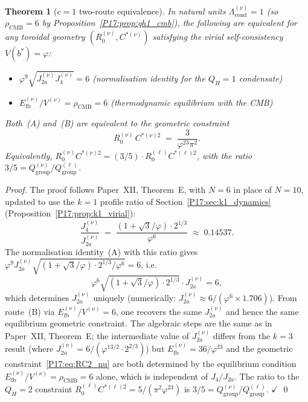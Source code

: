 \documentclass[11pt,a4paper]{article}
\newtheorem{theorem}{Theorem}[section]
\theoremstyle{definition}\newtheorem{definition}[theorem]{Definition}
\theoremstyle{remark}
\newcommand{\vp}{\varphi}
\newcommand{\Ja}{J_{2a}}
\newcommand{\Jfour}{J_4}
\newcommand{\Lcond}{\Lambda_{\mathrm{cond}}}
\newcommand{\rCMB}{\rho_{\mathrm{CMB}}}
\newcommand{\Efb}{E_{\mathrm{fb}}}
\newcommand{\QH}{Q_H}
\begin{document}
\begin{theorem}[$c=1$ two-route equivalence]
\label{P17:thm:qh1_tworoute}
In natural units $\Lcond^{(\nu)}=1$ (so $\rCMB=6$ by
Proposition~\ref{P17:prop:qh1_cmb}), the following are equivalent for
any toroidal geometry $(R_0^{(\nu)},C^{*(\nu)})$ satisfying
the virial self-consistency $V(b^*)=\vp$:
\begin{itemize}[noitemsep]
\item[\textup{(A)}]
  $\vp^9\sqrt{\Ja^{(\nu)}\Jfour^{(\nu)}}=6$
  \quad\textup{(normalisation identity for the $\QH=1$ condensate)}
\item[\textup{(B)}]
  $\Efb^{(\nu)}/V^{(\nu)}=\rCMB=6$
  \quad\textup{(thermodynamic equilibrium with the CMB)}
\end{itemize}
Both~\textup{(A)} and~\textup{(B)} are equivalent to the geometric
constraint
\begin{equation}
  \boxed{R_0^{(\nu)}\,C^{*(\nu)2}
  \;=\; \frac{3}{\vp^{23}\pi^2}.}
  \label{P17:eq:RC2_nu}
\end{equation}
Equivalently, $R_0^{(\nu)}C^{*(\nu)2}=(3/5)\cdot R_0^{(\ell)}C^{*(\ell)2}$,
with the ratio $3/5=Q_{\mathrm{group}}^{(\nu)}/Q_{\mathrm{group}}^{(\ell)}$.
\end{theorem}

\begin{proof}
The proof follows Paper~XII, Theorem~E, with $N=6$ in place of $N=10$,
updated to use the $k=1$ profile ratio of
Section~\ref{P17:sec:k1_dynamics} (Proposition~\ref{P17:prop:k1_virial}):
\begin{equation}
  \frac{\Jfour^{(\nu)}}{\Ja^{(\nu)}}
  \;=\; \frac{(1+\sqrt{3}/\vp)\cdot2^{1/3}}{\vp^6}
  \;\approx\; 0.14537.
  \label{P17:eq:J4Ja_k1_used}
\end{equation}
The normalisation identity~(A) with this ratio gives
$\vp^9\Ja^{(\nu)}\sqrt{(1+\sqrt{3}/\vp)\cdot2^{1/3}/\vp^6}=6$,
i.e.\
\begin{equation}
  \vp^{6}\sqrt{(1+\sqrt{3}/\vp)\cdot2^{1/3}}\cdot\Ja^{(\nu)}=6,
  \label{P17:eq:JaN_k1}
\end{equation}
which determines $\Ja^{(\nu)}$ uniquely (numerically:
$\Ja^{(\nu)}\approx6/(\vp^6\times1.706)$).
From route~(B) via $E_{\mathrm{fb}}^{(\nu)}/V^{(\nu)}=6$, one recovers the same
$\Ja^{(\nu)}$ and hence the same equilibrium geometric constraint.
The algebraic steps are the same as in Paper~XII, Theorem~E; the
intermediate value of $\Ja^{(\nu)}$ differs from the $k=3$ result
(where $\Ja^{(\nu)}=6/(\vp^{13/2}\cdot2^{2/3})$) but $\Efb^{(\nu)}=36/\vp^{23}$
and the geometric constraint~\eqref{P17:eq:RC2_nu} are both determined by
the equilibrium condition $\Efb^{(\nu)}/V^{(\nu)}=\rCMB=6$ alone,
which is independent of $\Jfour/\Ja$.
The ratio to the $\QH=2$ constraint
$R_0^{(\ell)}C^{*(\ell)2}=5/(\pi^2\vp^{23})$ is
$3/5=Q_{\mathrm{group}}^{(\nu)}/Q_{\mathrm{group}}^{(\ell)}$. $\checkmark$
\qed
\end{proof}
\end{document}
